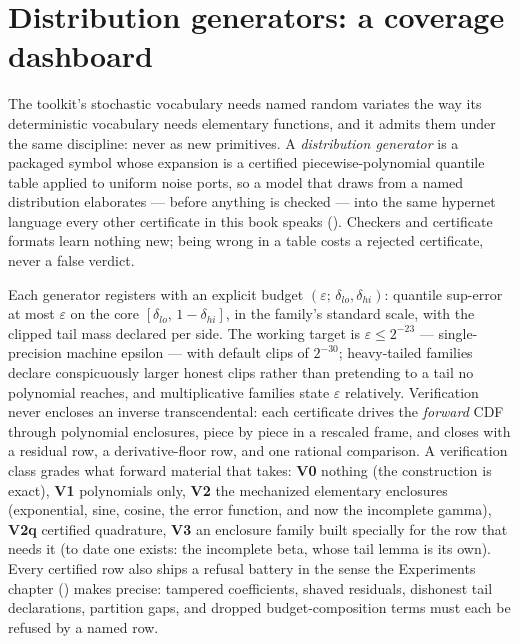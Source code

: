 \section{Distribution generators: a coverage dashboard}
\label{sec:exp-dist}

The toolkit's stochastic vocabulary needs named random variates the way
its deterministic vocabulary needs elementary functions, and it admits
them under the same discipline: never as new primitives. A
\emph{distribution generator} is a packaged symbol whose expansion is a
certified piecewise-polynomial quantile table applied to uniform noise
ports, so a model that draws from a named distribution elaborates ---
before anything is checked --- into the same hypernet language every
other certificate in this book speaks
(). Checkers and
certificate formats learn nothing new; being wrong in a table costs a
rejected certificate, never a false verdict.

Each generator registers with an explicit budget
$(\varepsilon;\,\delta_{lo},\delta_{hi})$: quantile sup-error at most
$\varepsilon$ on the core $[\delta_{lo},\,1-\delta_{hi}]$, in the
family's standard scale, with the clipped tail mass declared per side.
The working target is $\varepsilon \le 2^{-23}$ --- single-precision
machine epsilon --- with default clips of $2^{-30}$; heavy-tailed
families declare conspicuously larger honest clips rather than
pretending to a tail no polynomial reaches, and multiplicative families
state $\varepsilon$ relatively. Verification never encloses an inverse
transcendental: each certificate drives the \emph{forward} CDF through
polynomial enclosures, piece by piece in a rescaled frame, and closes
with a residual row, a derivative-floor row, and one rational
comparison. A verification class grades what forward material that
takes: \textbf{V0} nothing (the construction is exact), \textbf{V1}
polynomials only, \textbf{V2} the mechanized elementary enclosures
(exponential, sine, cosine, the error function, and now the incomplete
gamma), \textbf{V2q} certified quadrature, \textbf{V3} an enclosure
family built specially for the row that needs it (to date one exists:
the incomplete beta, whose tail lemma is its own). Every certified row also ships a refusal battery in the
sense the Experiments chapter
() makes precise: tampered coefficients, shaved residuals,
dishonest tail declarations, partition gaps, and dropped
budget-composition terms must each be refused by a named row.

